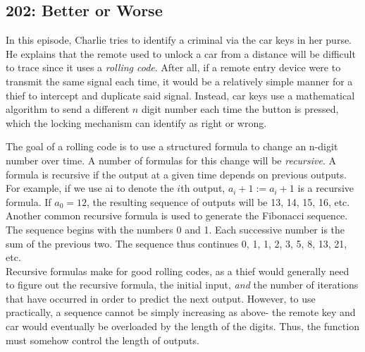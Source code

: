 \newpage
\subsection{202: Better or Worse\label{202}}

In this episode, Charlie tries to identify a criminal via the car keys in her purse. He explains that the remote used to unlock a car from a distance will be difficult to trace since it uses a \emph{rolling code}. After all, if a remote entry device were to transmit the same signal each time, it would be a relatively simple manner for a thief to intercept and duplicate said signal. Instead, car keys use a mathematical algorithm to send a different $n$ digit number each time the button is pressed, which the locking mechanism can identify as right or wrong.


The goal of a rolling code is to use a structured formula to change an n-digit number over time. A number of formulas for this change will be \emph{recursive}. A formula is recursive if the output at a given time depends on previous outputs. For example, if we use ai to denote the $i$th output, $a_i+1 := a_i + 1$ is a recursive formula. If $a_0=12$, the resulting sequence of outputs will be 13, 14, 15, 16, etc. \\

Another common recursive formula is used to generate the Fibonacci sequence. The sequence begins with the numbers 0 and 1. Each successive number is the sum of the previous two. The sequence thus continues 0, 1, 1, 2, 3, 5, 8, 13, 21, etc. \\

Recursive formulas make for good rolling codes, as a thief would generally need to figure out the recursive formula, the initial input, \emph{and} the number of iterations that have occurred in order to predict the next output. However, to use practically, a sequence cannot be simply increasing as above- the remote key and car would eventually be overloaded by the length of the digits. Thus, the function must somehow control the length of outputs. \\

 \vspace{0.2cm}

